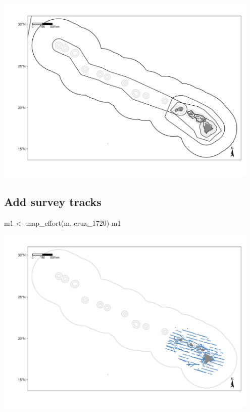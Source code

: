 \documentclass[
]{book}
\newenvironment{Shaded}{\begin{snugshade}}{\end{snugshade}}
\newcommand{\FunctionTok}[1]{\textcolor[rgb]{0.00,0.00,0.00}{#1}}
\newcommand{\NormalTok}[1]{#1}
\newcommand{\OtherTok}[1]{\textcolor[rgb]{0.56,0.35,0.01}{#1}}
\begin{document}
\includegraphics[width=0.95\textwidth,height=\textheight]{img/map_cnp_strata.png}

\hypertarget{add-survey-tracks}{%
\subsection*{Add survey tracks}\label{add-survey-tracks}}

\begin{Shaded}
\begin{Highlighting}[]
\NormalTok{m1 }\OtherTok{\textless{}{-}} \FunctionTok{map\_effort}\NormalTok{(m, cruz\_1720)}
\NormalTok{m1}
\end{Highlighting}
\end{Shaded}

\includegraphics[width=0.95\textwidth,height=\textheight]{img/map_tracks.png}
\end{document}
